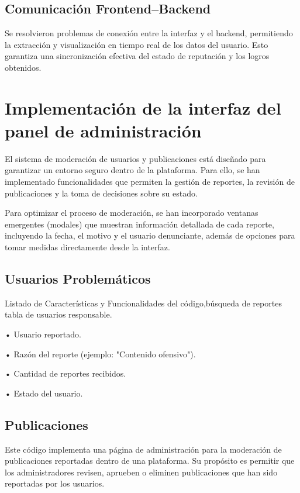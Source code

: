\documentclass[11pt, a4paper, oneside]{book}
\begin{document}
\section{Comunicación Frontend–Backend}

Se resolvieron problemas de conexión entre la interfaz y el backend, permitiendo la extracción y visualización en tiempo real de los datos del usuario. Esto garantiza una sincronización efectiva del estado de reputación y los logros obtenidos.




\chapter{ Implementación de la interfaz del panel de administración }

El sistema de moderación de usuarios y publicaciones está diseñado para garantizar un entorno seguro dentro de la plataforma. Para ello, se han implementado funcionalidades que permiten la gestión de reportes, la revisión de publicaciones y la toma de decisiones sobre su estado.

\hspace{2cm}

Para optimizar el proceso de moderación, se han incorporado ventanas emergentes (modales) que muestran información detallada de cada reporte, incluyendo la fecha, el motivo y el usuario denunciante, además de opciones para tomar medidas directamente desde la interfaz.

\section{Usuarios Problemáticos }

Listado de Características y Funcionalidades del código,búsqueda de reportes tabla de usuarios responsable.


• Usuario reportado.

• Razón del reporte (ejemplo: "Contenido ofensivo").

• Cantidad de reportes recibidos.

• Estado del usuario. 

\hspace{6cm}

\section{Publicaciones } 

Este código implementa una página de administración para la moderación de publicaciones reportadas dentro de una plataforma. Su propósito es permitir que los
administradores revisen, aprueben o eliminen publicaciones que han sido reportadas por los usuarios. 
\end{document}
